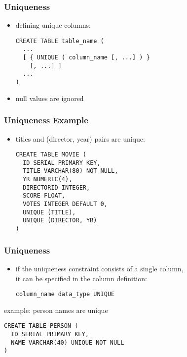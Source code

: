 \documentclass[dvipsnames]{beamer}
\theoremstyle{plain}
\begin{document}
\begin{frame}[fragile]
  \frametitle{Uniqueness}

  \begin{itemize}
    \item defining unique columns:
    \begin{lstlisting}
CREATE TABLE table_name (
  ...
  [ { UNIQUE ( column_name [, ...] ) }
    [, ...] ]
  ...
)
    \end{lstlisting}

    \item null values are ignored
  \end{itemize}
\end{frame}

\begin{frame}[fragile]
  \frametitle{Uniqueness Example}

  \begin{itemize}
    \item titles and (director, year) pairs are unique:
    \begin{lstlisting}
CREATE TABLE MOVIE (
  ID SERIAL PRIMARY KEY,
  TITLE VARCHAR(80) NOT NULL,
  YR NUMERIC(4),
  DIRECTORID INTEGER,
  SCORE FLOAT,
  VOTES INTEGER DEFAULT 0,
  UNIQUE (TITLE),
  UNIQUE (DIRECTOR, YR)
)
    \end{lstlisting}
  \end{itemize}
\end{frame}

\begin{frame}[fragile]
  \frametitle{Uniqueness}

  \begin{itemize}
    \item if the uniqueness constraint consists of a single column,\\
      it can be specified in the column definition:
    \begin{lstlisting}
column_name data_type UNIQUE
    \end{lstlisting}
  \end{itemize}

  \begin{exampleblock}{example: person names are unique}
    \begin{lstlisting}
CREATE TABLE PERSON (
  ID SERIAL PRIMARY KEY,
  NAME VARCHAR(40) UNIQUE NOT NULL
)
    \end{lstlisting}
  \end{exampleblock}
\end{frame}
\end{document}
